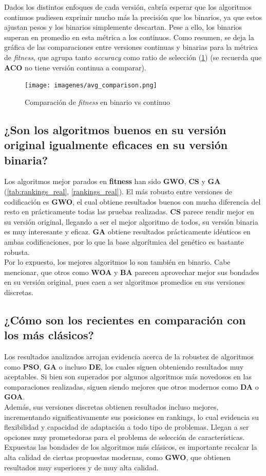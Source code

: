 Dados los distintos enfoques de cada versión, cabría esperar que los algoritmos continuos pudiesen exprimir mucho más la precisión que los binarios, ya que estos ajustan pesos y los binarios simplemente descartan. Pese a ello, los binarios superan en promedio en esta métrica a los continuos. Como resumen, se deja la gráfica de las comparaciones entre versiones continuas y binarias para la métrica de \textit{fitness}, que agrupa tanto \textit{accuracy} como ratio de selección (\ref{fig:bin_vs_real_avg}) (se recuerda que \textbf{ACO} no tiene versión continua a comparar).

\begin{figure}[htp]
    \texttt{[image: imagenes/avg\_comparison.png]}
    \caption{Comparación de \textit{fitness} en binario vs continuo}
    \label{fig:bin_vs_real_avg}
\end{figure}

\subsection{¿Son los algoritmos buenos en su versión original igualmente eficaces en su versión binaria?}
Los algoritmos mejor parados en \textbf{fitness} han sido \textbf{GWO}, \textbf{CS} y \textbf{GA} (\ref{tab:rankings_real}, \ref{rankings_real}). El más robusto entre versiones de codificación es \textbf{GWO}, el cual obtiene resultados buenos con mucha diferencia del resto en prácticamente todas las pruebas realizadas. \textbf{CS} parece rendir mejor en su versión original, llegando a ser el mejor algoritmo de todos, su versión binaria es muy interesante y eficaz. \textbf{GA} obtiene resultados prácticamente idénticos en ambas codificaciones, por lo que la base algorítmica del genético es bastante robusta.\\[6pt]
Por lo expuesto, los mejores algoritmos lo son también en binario. Cabe mencionar, que otros como \textbf{WOA} y \textbf{BA} parecen aprovechar mejor sus bondades en su versión original, pues caen a ser algoritmos promedios en sus versiones discretas.
\subsection{¿Cómo son los recientes en comparación con los más clásicos?}
Los resultados analizados arrojan evidencia acerca de la robustez de algoritmos como \textbf{PSO}, \textbf{GA} o incluso \textbf{DE}, los cuales siguen obteniendo resultados muy aceptables. Si bien son superados por algunos algoritmos más novedosos en las comparaciones realizadas, siguen siendo mejores que otros modernos como \textbf{DA} o \textbf{GOA}.\\[6pt]
Además, sus versiones discretas obtienen resultados incluso mejores, incrementando significativamente sus posiciones en rankings, lo cual evidencia su flexibilidad y capacidad de adaptación a todo tipo de problemas. Llegan a ser opciones muy prometedoras para el problema de selección de características.\\[6pt]
Expuestas las bondades de los algoritmos más clásicos, es importante recalcar la alta calidad de ciertas propuestas modernas, como \textbf{GWO}, que obtienen resultados muy superiores y de muy alta calidad.

